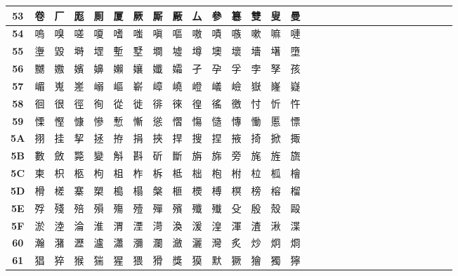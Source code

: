 \begin{table}[H]
\begin{tabular}{|Sc|Sc|Sc|Sc|Sc|Sc|Sc|Sc|Sc|Sc|Sc|Sc|Sc|Sc|Sc|}
\textbf{53} & 卷 & 厂 & 厖 & 厠 & 厦 & 厥 & 厮 & 厰 & 厶 & 參 & 簒 & 雙 & 叟 & 曼 \\ \hline
\textbf{54} & 嗚 & 嗅 & 嗟 & 嗄 & 嗜 & 嗤 & 嗔 & 嘔 & 嗷 & 嘖 & 嗾 & 嗽 & 嘛 & 嗹 \\ \hline
\textbf{55} & 塰 & 毀 & 塒 & 堽 & 塹 & 墅 & 墹 & 墟 & 墫 & 墺 & 壞 & 墻 & 墸 & 墮 \\ \hline
\textbf{56} & 嬲 & 嫐 & 嬪 & 嬶 & 嬾 & 孃 & 孅 & 孀 & 孑 & 孕 & 孚 & 孛 & 孥 & 孩 \\ \hline
\textbf{57} & 嵋 & 嵬 & 嵳 & 嵶 & 嶇 & 嶄 & 嶂 & 嶢 & 嶝 & 嶬 & 嶮 & 嶽 & 嶐 & 嶷 \\ \hline
\textbf{58} & 徊 & 很 & 徑 & 徇 & 從 & 徙 & 徘 & 徠 & 徨 & 徭 & 徼 & 忖 & 忻 & 忤 \\ \hline
\textbf{59} & 慄 & 慳 & 慷 & 慘 & 慙 & 慚 & 慫 & 慴 & 慯 & 慥 & 慱 & 慟 & 慝 & 慓 \\ \hline
\textbf{5A} & 挧 & 挂 & 挈 & 拯 & 拵 & 捐 & 挾 & 捍 & 搜 & 捏 & 掖 & 掎 & 掀 & 掫 \\ \hline
\textbf{5B} & 數 & 斂 & 斃 & 變 & 斛 & 斟 & 斫 & 斷 & 旃 & 旆 & 旁 & 旄 & 旌 & 旒 \\ \hline
\textbf{5C} & 柬 & 枳 & 柩 & 枸 & 柤 & 柞 & 柝 & 柢 & 柮 & 枹 & 柎 & 柆 & 柧 & 檜 \\ \hline
\textbf{5D} & 榾 & 槎 & 寨 & 槊 & 槝 & 榻 & 槃 & 榧 & 樮 & 榑 & 榠 & 榜 & 榕 & 榴 \\ \hline
\textbf{5E} & 殍 & 殘 & 殕 & 殞 & 殤 & 殪 & 殫 & 殯 & 殲 & 殱 & 殳 & 殷 & 殼 & 毆 \\ \hline
\textbf{5F} & 淤 & 淕 & 淪 & 淮 & 渭 & 湮 & 渮 & 渙 & 湲 & 湟 & 渾 & 渣 & 湫 & 渫 \\ \hline
\textbf{60} & 瀚 & 潴 & 瀝 & 瀘 & 瀟 & 瀰 & 瀾 & 瀲 & 灑 & 灣 & 炙 & 炒 & 炯 & 烱 \\ \hline
\textbf{61} & 猖 & 猝 & 猴 & 猯 & 猩 & 猥 & 猾 & 獎 & 獏 & 默 & 獗 & 獪 & 獨 & 獰 \\ \hline
\end{tabular}
\end{table}

